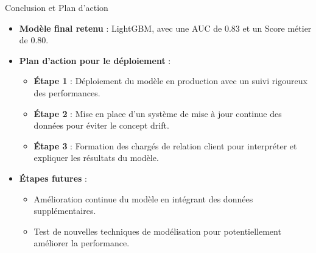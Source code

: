 \documentclass{beamer}
\begin{document}
\begin{frame}{Conclusion et Plan d'action}
    \begin{itemize}
        \item \textbf{Modèle final retenu} : LightGBM, avec une AUC de 0.83 et un Score métier de 0.80.
        \item \textbf{Plan d'action pour le déploiement} :
            \begin{itemize}
                \item \textbf{Étape 1} : Déploiement du modèle en production avec un suivi rigoureux des performances.
                \item \textbf{Étape 2} : Mise en place d'un système de mise à jour continue des données pour éviter le concept drift.
                \item \textbf{Étape 3} : Formation des chargés de relation client pour interpréter et expliquer les résultats du modèle.
            \end{itemize}
        \item \textbf{Étapes futures} :
            \begin{itemize}
                \item Amélioration continue du modèle en intégrant des données supplémentaires.
                \item Test de nouvelles techniques de modélisation pour potentiellement améliorer la performance.
            \end{itemize}
    \end{itemize}
\end{frame}
\end{document}
